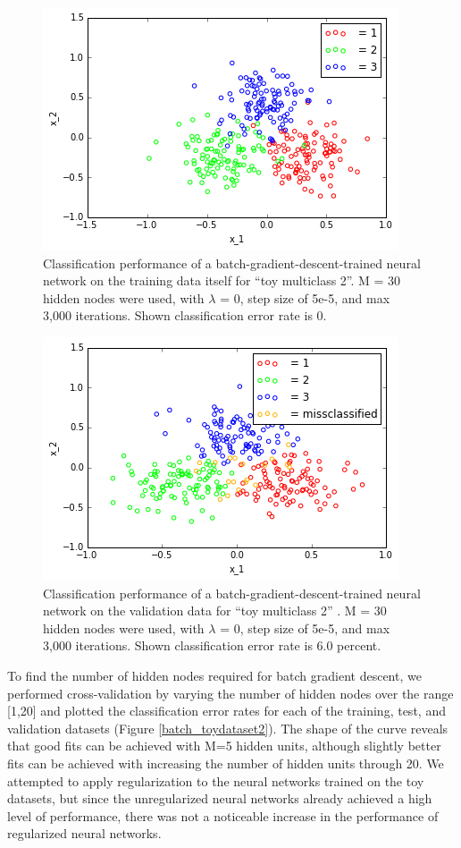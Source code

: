 \documentclass[10pt]{article}
\begin{document}
%
\begin{figure}
\centering
\includegraphics[scale=0.5]{toy2_train.png}
\caption{Classification performance of a batch-gradient-descent-trained neural network on the training data itself for ``toy multiclass 2''.  M = 30 hidden nodes were used, with $\lambda$ = 0, step size of 5e-5, and max 3,000 iterations. Shown classification error rate is 0.}
\label{toy2_train}
\end{figure}
%
\begin{figure}
\centering
\includegraphics[scale=0.5]{toy2_val.png}
\caption{Classification performance of a batch-gradient-descent-trained neural network on the validation data for ``toy multiclass 2'' .  M = 30 hidden nodes were used, with $\lambda$ = 0, step size of 5e-5, and max 3,000 iterations. Shown classification error rate is 6.0 percent.}
\label{toy2_val}
\end{figure}
%
To find the number of hidden nodes required for batch gradient descent, we performed cross-validation by varying the number of hidden nodes over the range [1,20] and plotted the classification error rates for each of the training, test, and validation datasets (Figure \ref{batch_toydataset2}).  The shape of the curve reveals that good fits can be achieved with M=5 hidden units, although slightly better fits can be achieved with increasing the number of hidden units through 20.  We attempted to apply regularization to the neural networks trained on the toy datasets, but since the unregularized neural networks already achieved a high level of performance, there was not a noticeable increase in the performance of regularized neural networks.
\end{document}
